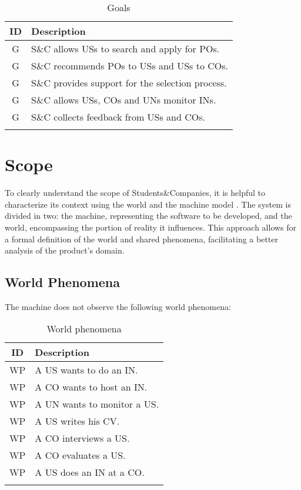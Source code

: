 \setcounter{g}{1}
\newcommand{\gc}{\theg\stepcounter{g}}
\renewcommand{\arraystretch}{1.5}
\begin{longtable}{|c|p{10.5cm}|}
    \hline \rowcolor{polimiblue!40}
    \textbf{ID} & \textbf{Description} \\ \hline
    G\gc & S\&C allows USs to search and apply for POs. \\ \hline
    G\gc & S\&C recommends POs to USs and USs to COs. \\ \hline
    G\gc & S\&C provides support for the selection process. \\ \hline
    G\gc & S\&C allows USs, COs and UNs monitor INs. \\ \hline
    G\gc & S\&C collects feedback from USs and COs. \\ \hline
\caption{Goals}
\end{longtable}

\section{Scope}
To clearly understand the scope of Students\&Companies, it is helpful to characterize its context using the world and the machine model \cite{jackson1995}.
The system is divided in two: the machine, representing the software to be developed, and the world, encompassing the portion of reality it influences.
This approach allows for a formal definition of the world and shared phenomena, facilitating a better analysis of the product's domain.

\subsection{World Phenomena}
The machine does not observe the following world phenomena:

\setcounter{wp}{1}
\newcommand{\wpc}{\thewp\stepcounter{wp}}
\renewcommand{\arraystretch}{1.5}
\begin{longtable}{|c|p{10.5cm}|}
    \hline \rowcolor{polimiblue!40}
    \textbf{ID} & \textbf{Description} \\ \hline
    WP\wpc & A US wants to do an IN. \\ \hline
    WP\wpc & A CO wants to host an IN. \\ \hline
    WP\wpc & A UN wants to monitor a US. \\ \hline
    WP\wpc & A US writes his CV. \\ \hline
    WP\wpc & A CO interviews a US. \\ \hline
    WP\wpc & A CO evaluates a US. \\ \hline
    WP\wpc & A US does an IN at a CO. \\ \hline
\caption{World phenomena}
\end{longtable}

